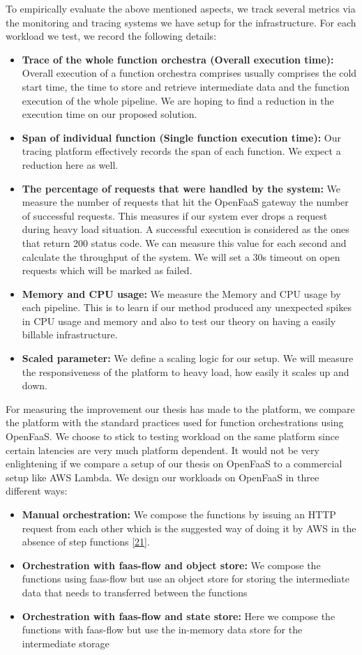 \documentclass[12pt,titlepage]{article}
\begin{document}
To empirically evaluate the above mentioned aspects, we track several metrics
via the monitoring and tracing systems we have setup for the infrastructure. For
each workload we test, we record the following details:
\begin{itemize}
\item \textbf{Trace of the whole function orchestra (Overall execution time):}
Overall execution of a function orchestra comprises usually comprises the cold start
time, the time to store and retrieve intermediate data and the function
execution of the whole pipeline. We are hoping to find a reduction in the
execution time on our proposed solution.
\item \textbf{Span of individual function (Single function execution time):}
Our tracing platform effectively records the span of each function. We expect
a reduction here as well.
\item \textbf{The percentage of requests that were handled by the system:}
We measure the number of requests that hit the OpenFaaS gateway the number of
successful requests. This measures if our system ever drops a request during
heavy load situation. A successful execution is considered as the ones that
return 200 status code. We can measure this value for each second and
calculate the throughput of the system. We will set a 30s timeout on open requests which will
be marked as failed.
\item \textbf{Memory and CPU usage:}
We measure the Memory and CPU usage by each pipeline. This is to learn if our
method produced any unexpected spikes in CPU usage and memory and also to test
our theory on having a easily billable infrastructure.
\item \textbf{Scaled parameter:}
We define a scaling logic for our setup. We will measure the responsiveness of
the platform to heavy load, how easily it scales up and down.
\end{itemize}

For measuring the improvement our thesis has made to the platform, we compare the platform with the standard practices used for function
orchestrations using OpenFaaS. We choose to stick to testing workload on the
same platform since certain latencies are very much platform dependent. It
would not be very enlightening if we compare a setup of our thesis on OpenFaaS to
a commercial setup like AWS Lambda. We design our workloads on OpenFaaS in three different ways:
\begin{itemize}
\item \textbf{Manual orchestration:}
We compose the functions by issuing an HTTP request from each other which is
the suggested way of doing it by AWS in the absence of step functions \hyperref[ref:21]{[21}].
\item \textbf{Orchestration with faas-flow and object store:}
We compose the functions using faas-flow but use an object store for storing
the intermediate data that needs to transferred between the functions
\item \textbf{Orchestration with faas-flow and state store:}
Here we compose the functions with faas-flow but use the in-memory data store
for the intermediate storage
\end{itemize}
\end{document}

